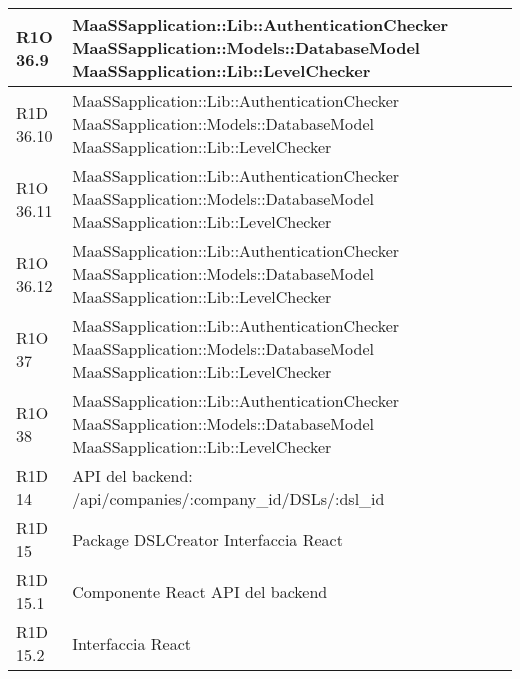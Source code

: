 \begin{center}
\begin{longtable}{ | l | p{8cm} |}
   	R1O 36.9 & MaaSSapplication::Lib::AuthenticationChecker \newline  MaaSSapplication::Models::DatabaseModel \newline MaaSSapplication::Lib::LevelChecker \\ \hline
   	
   	R1D 36.10 & MaaSSapplication::Lib::AuthenticationChecker \newline  MaaSSapplication::Models::DatabaseModel \newline MaaSSapplication::Lib::LevelChecker \\ \hline
   	
   	R1O 36.11 & MaaSSapplication::Lib::AuthenticationChecker \newline  MaaSSapplication::Models::DatabaseModel \newline MaaSSapplication::Lib::LevelChecker \\ \hline
   	
   	R1O 36.12 & MaaSSapplication::Lib::AuthenticationChecker \newline  MaaSSapplication::Models::DatabaseModel \newline MaaSSapplication::Lib::LevelChecker \\ \hline
   	
   	R1O 37 & MaaSSapplication::Lib::AuthenticationChecker \newline  MaaSSapplication::Models::DatabaseModel \newline MaaSSapplication::Lib::LevelChecker \\ \hline
   	
   	R1O 38 & MaaSSapplication::Lib::AuthenticationChecker \newline  MaaSSapplication::Models::DatabaseModel \newline MaaSSapplication::Lib::LevelChecker \\ \hline

	R1D 14 & API del backend: /api/companies/:company\_id/DSLs/:dsl\_id \\ \hline
	
	R1D 15 & Package DSLCreator \newline Interfaccia React \\ \hline

	R1D 15.1 & Componente React \newline API del backend \\ \hline

	R1D 15.2 & Interfaccia React \\ \hline


\end{longtable}
\end{center}
